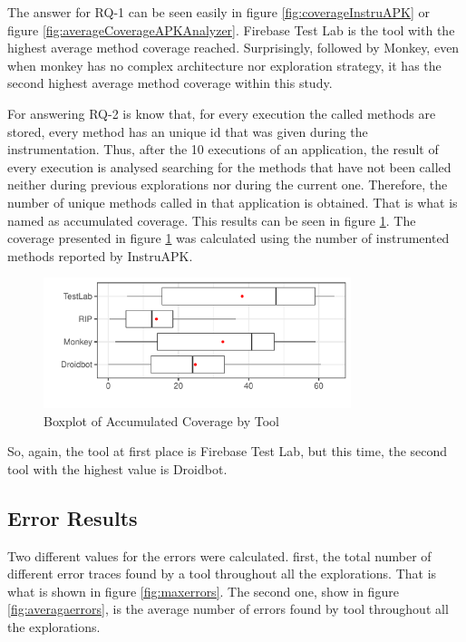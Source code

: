 The answer for RQ-1 can be seen easily in figure \ref{fig:coverageInstruAPK} or figure \ref{fig:averageCoverageAPKAnalyzer}. Firebase Test Lab is the tool with the highest average method coverage reached. Surprisingly, followed by Monkey, even when monkey has no complex architecture nor exploration strategy, it has the second highest average method coverage within this study.

For answering RQ-2 is know that, for every execution the called methods are stored, every method has an unique id that was given during the instrumentation. Thus, after the 10 executions of an application, the result of every execution is analysed searching for the methods that have not been called neither during previous explorations nor during the current one. Therefore, the number of unique methods called in that application is obtained. That is what is named as accumulated coverage. This results can be seen in figure \ref{fig:boxplotAccumulated}. The coverage presented in figure \ref{fig:boxplotAccumulated} was calculated using the number of instrumented methods reported by InstruAPK. 

\begin{figure}[h]
\centering
\includegraphics[width=0.8\textwidth]{../Figures/boxplotAccumulated.pdf}
\caption{Boxplot of Accumulated Coverage by Tool}\label{fig:boxplotAccumulated}
\end{figure}

So, again, the tool at first place is Firebase Test Lab, but this time, the second tool with the highest value is Droidbot.

\subsection{Error Results}\label{sec:errorResults}

Two different values for the errors were calculated. first, the total number of different error traces found by a tool throughout all the explorations. That is what is shown in figure \ref{fig:maxerrors}. The second one, show in figure \ref{fig:averagaerrors}, is the average number of errors found by tool throughout all the explorations. 

